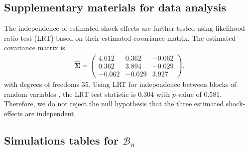 \documentclass[11pt]{article}
\def\mc#1{\mathcal{#1}} %
\theoremstyle{definition}
\begin{document}
\subsection{Supplementary materials for data analysis}
\label{smfda}
The independence of estimated shock-effects are further tested using likelihood ratio test (LRT) based on their estimated covariance matrix. The estimated covariance matrix is
\begin{align*}
  \hat{\mathbf{\Sigma}}=\left(\begin{array}{rrr}
    4.012 & 0.362 & -0.062 \\
    0.362 & 3.894 & -0.029 \\
    -0.062 & -0.029 & 3.927
  \end{array}\right).
\end{align*}
with degrees of freedoms 35.
Using LRT for independence between blocks of random variables \citep[Section 10.2]{msos}, the LRT test statistic is $0.304$ with $p$-value of 0.581. Therefore, we do not reject  the null hypothesis that the three estimated shock-effects are independent.

\subsection{Simulations tables for $\mc{B}_u$}
\label{simulationappendix}
\end{document}
